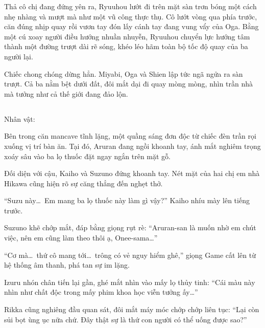 \documentclass[../main.tex]{subfiles}
\begin{document}
Thả cô chị đang đứng yên ra, Ryuuhou lướt đi trên mặt sàn trơn bóng một cách nhẹ nhàng và mượt mà như một vũ công thực thụ. Cô lướt vòng qua phía trước, căn đúng nhịp quay rồi vươn tay đón lấy cánh tay đang vung vẩy của Oga. Bằng một cú xoay người điều hướng nhuần nhuyễn, Ryuuhou chuyển lực hướng tâm thành một đường trượt dài rẽ sóng, khéo léo hãm toàn bộ tốc độ quay của ba người lại.

Chiếc chong chóng dừng hẳn. Miyabi, Oga và Shien lập tức ngã ngửa ra sàn trượt. Cả ba nằm bệt dưới đất, đôi mắt dại đi quay mòng mòng, nhìn trần nhà mà tưởng như cả thế giới đang đảo lộn.

\newpage

\subsection*{\label{ep-SM.III}}
\vspace{-4pt}
\begin{center}
  {\caviar\fontsize{12pt}{12pt}\selectfont Nhân vật:       }
\end{center}

Bên trong căn mancave tĩnh lặng, một quầng sáng đơn độc từ chiếc đèn trần rọi xuống vị trí bàn ăn. Tại đó, Aruran đang ngồi khoanh tay, ánh mắt nghiêm trọng xoáy sâu vào ba lọ thuốc đặt ngay ngắn trên mặt gỗ.

Đối diện với cậu, Kaiho và Suzuno đứng khoanh tay. Nét mặt của hai chị em nhà Hikawa cũng hiện rõ sự căng thẳng đến nghẹt thở.

``Suzu này\dots\ Em mang ba lọ thuốc này làm gì vậy?'' Kaiho nhíu mày lên tiếng trước.

Suzuno khẽ chớp mắt, đáp bằng giọng rụt rè: ``Aruran-san là muốn nhờ em chút việc, nên em cũng làm theo thôi ạ, Onee-sama\dots''

``Cơ mà\dots\ thứ cô mang tới\dots\ trông có vẻ nguy hiểm ghê,'' giọng Game cất lên từ hệ thống âm thanh, phá tan sự im lặng.

Izuru nhón chân tiến lại gần, ghé mắt nhìn vào mấy lọ thủy tinh: ``Cái màu này nhìn như chất độc trong mấy phim khoa học viễn tưởng ấy\dots''

Rikka cũng nghiêng đầu quan sát, đôi mắt máy móc chớp chớp liên tục: ``Lại còn sủi bọt ùng ục nữa chứ. Đây thật sự là thứ con người có thể uống được sao?''
\end{document}
